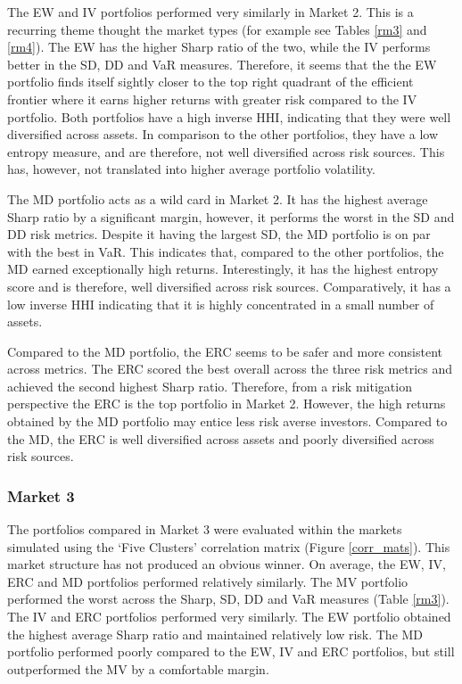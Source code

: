 \documentclass[11pt,preprint, authoryear]{elsarticle}
\numberwithin{equation}{section}
\numberwithin{figure}{section}
\numberwithin{table}{section}
\begin{document}
The EW and IV portfolios performed very similarly in Market 2. This is a
recurring theme thought the market types (for example see Tables
\ref{rm3} and \ref{rm4}). The EW has the higher Sharp ratio of the two,
while the IV performs better in the SD, DD and VaR measures. Therefore,
it seems that the the EW portfolio finds itself sightly closer to the
top right quadrant of the efficient frontier where it earns higher
returns with greater risk compared to the IV portfolio. Both portfolios
have a high inverse HHI, indicating that they were well diversified
across assets. In comparison to the other portfolios, they have a low
entropy measure, and are therefore, not well diversified across risk
sources. This has, however, not translated into higher average portfolio
volatility.

The MD portfolio acts as a wild card in Market 2. It has the highest
average Sharp ratio by a significant margin, however, it performs the
worst in the SD and DD risk metrics. Despite it having the largest SD,
the MD portfolio is on par with the best in VaR. This indicates that,
compared to the other portfolios, the MD earned exceptionally high
returns. Interestingly, it has the highest entropy score and is
therefore, well diversified across risk sources. Comparatively, it has a
low inverse HHI indicating that it is highly concentrated in a small
number of assets.

Compared to the MD portfolio, the ERC seems to be safer and more
consistent across metrics. The ERC scored the best overall across the
three risk metrics and achieved the second highest Sharp ratio.
Therefore, from a risk mitigation perspective the ERC is the top
portfolio in Market 2. However, the high returns obtained by the MD
portfolio may entice less risk averse investors. Compared to the MD, the
ERC is well diversified across assets and poorly diversified across risk
sources.

\hypertarget{market-3}{%
\subsubsection{Market 3}\label{market-3}}

The portfolios compared in Market 3 were evaluated within the markets
simulated using the `Five Clusters' correlation matrix (Figure
\ref{corr_mats}). This market structure has not produced an obvious
winner. On average, the EW, IV, ERC and MD portfolios performed
relatively similarly. The MV portfolio performed the worst across the
Sharp, SD, DD and VaR measures (Table \ref{rm3}). The IV and ERC
portfolios performed very similarly. The EW portfolio obtained the
highest average Sharp ratio and maintained relatively low risk. The MD
portfolio performed poorly compared to the EW, IV and ERC portfolios,
but still outperformed the MV by a comfortable margin.
\end{document}
